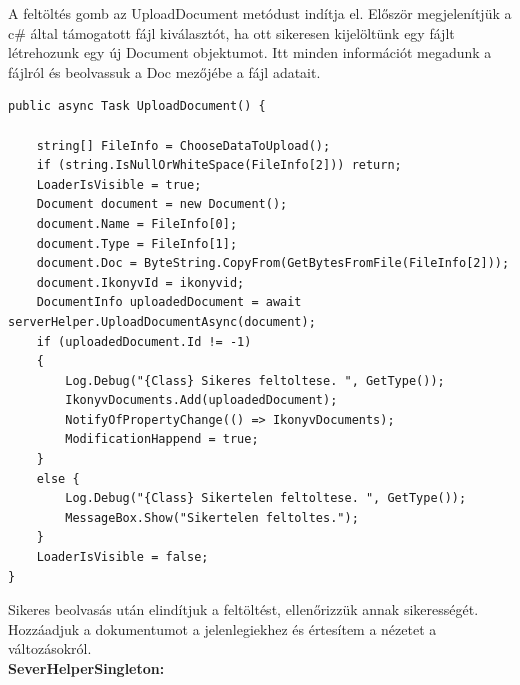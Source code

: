 \documentclass[
]{thesis-ekf}
\theoremstyle{definition}
\theoremstyle{remark}
\begin{document}
A feltöltés gomb az UploadDocument metódust indítja el. Először megjelenítjük a c\# által támogatott fájl kiválasztót, ha ott sikeresen kijelöltünk egy fájlt létrehozunk egy új Document objektumot. Itt minden információt megadunk a fájlról és beolvassuk a Doc mezőjébe a fájl adatait.
\begin{lstlisting}[showstringspaces=false,caption={Dokumentum feltöltése.},captionpos=b]
public async Task UploadDocument() {

	string[] FileInfo = ChooseDataToUpload();
	if (string.IsNullOrWhiteSpace(FileInfo[2])) return;
	LoaderIsVisible = true;
	Document document = new Document();
	document.Name = FileInfo[0];
	document.Type = FileInfo[1];
	document.Doc = ByteString.CopyFrom(GetBytesFromFile(FileInfo[2]));
	document.IkonyvId = ikonyvid;
	DocumentInfo uploadedDocument = await serverHelper.UploadDocumentAsync(document);
	if (uploadedDocument.Id != -1)
	{
		Log.Debug("{Class} Sikeres feltoltese. ", GetType());
		IkonyvDocuments.Add(uploadedDocument);
		NotifyOfPropertyChange(() => IkonyvDocuments);
		ModificationHappend = true;
	}
	else {
		Log.Debug("{Class} Sikertelen feltoltese. ", GetType());
		MessageBox.Show("Sikertelen feltoltes.");
	}
	LoaderIsVisible = false;
}
\end{lstlisting}
Sikeres beolvasás után elindítjuk a feltöltést, ellenőrizzük annak sikerességét. Hozzáadjuk a dokumentumot a jelenlegiekhez és értesítem a nézetet a változásokról.\\
\textbf{SeverHelperSingleton:}
\end{document}
